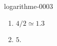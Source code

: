 
\begin{corrige}{logarithme-0003}

    \begin{enumerate}
        \item
            \( 4/2\simeq 1.3\)
        \item
            \( 5\).
    \end{enumerate}

\end{corrige}
